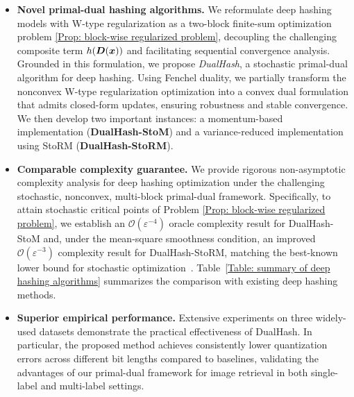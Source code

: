 \begin{itemize}[leftmargin=2em]
\item {\textbf{Novel primal-dual hashing algorithms.}} We reformulate deep hashing models with W-type regularization as a two-block finite-sum optimization problem \eqref{Prop: block-wise regularized problem}, decoupling the challenging composite term $h(\bm{D}(\bm{x}))$ and facilitating sequential convergence analysis. Grounded in this formulation, we propose \textit{DualHash}, a stochastic primal-dual algorithm for deep hashing. Using Fenchel duality, we partially transform the nonconvex W-type regularization optimization into a convex dual formulation that admits closed-form updates, ensuring robustness and stable convergence. We then develop two important instances: a momentum-based implementation (\textbf{DualHash-StoM}) and a variance-reduced implementation using StoRM (\textbf{DualHash-StoRM}).
\item {\textbf{Comparable complexity guarantee.} We provide rigorous non-asymptotic complexity analysis for deep hashing optimization under the challenging stochastic, nonconvex, multi-block primal-dual framework.} {Specifically, to attain stochastic critical points of Problem \eqref{Prop: block-wise regularized problem}, we establish an $\mathcal{O}(\varepsilon^{-4})$ oracle complexity result for DualHash-StoM and, under the mean-square smoothness condition, an improved $\mathcal{O}(\varepsilon^{-3})$ complexity result for DualHash-StoRM, matching the best-known lower bound for stochastic optimization~\cite{arjevani2023lower}}. Table~\ref{Table: summary of deep hashing algorithms} summarizes the comparison with existing deep hashing methods.
\item {\textbf{Superior empirical performance.} Extensive experiments on three widely-used datasets} demonstrate the practical effectiveness of DualHash. In particular, the proposed method achieves consistently lower quantization errors across different bit lengths compared to baselines, validating the advantages of our primal-dual framework for image retrieval in both single-label and multi-label settings. 
\end{itemize}
